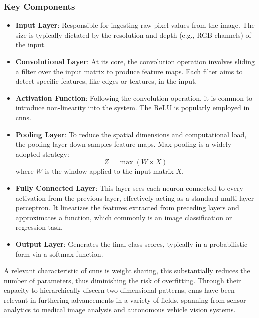 \subsubsection{Key Components}

\begin{itemize}
	\item \textbf{Input Layer}: Responsible for ingesting raw pixel values from the image. The size is typically dictated by the resolution and depth (e.g., RGB channels) of the input.
	
	\item \textbf{Convolutional Layer}: At its core, the convolution operation involves sliding a filter over the input matrix to produce feature maps. Each filter aims to detect specific features, like edges or textures, in the input.
	
	\item \textbf{Activation Function}: Following the convolution operation, it is common to introduce non-linearity into the system. The ReLU is popularly employed in \glspl{cnn}.
	
	\item \textbf{Pooling Layer}: To reduce the spatial dimensions and computational load, the pooling layer down-samples feature maps. Max pooling is a widely adopted strategy:
	\begin{equation}
	Z = \max(W \times X)
	\end{equation}
	where \(W\) is the window applied to the input matrix \(X\).
	
	\item \textbf{Fully Connected Layer}: This layer sees each neuron connected to every activation from the previous layer, effectively acting as a standard multi-layer perceptron. It linearizes the features extracted from preceding layers and approximates a function, which commonly is an image classification or regression task.
	
	\item \textbf{Output Layer}: Generates the final class scores, typically in a probabilistic form via a softmax function.
\end{itemize}

A relevant characteristic of \glspl{cnn} is weight sharing, this substantially reduces the number of parameters, thus diminishing the risk of overfitting. Through their capacity to hierarchically discern two-dimensional patterns, \glspl{cnn} have been relevant in furthering advancements in a variety of fields, spanning from sensor analytics to medical image analysis and autonomous vehicle vision systems.

